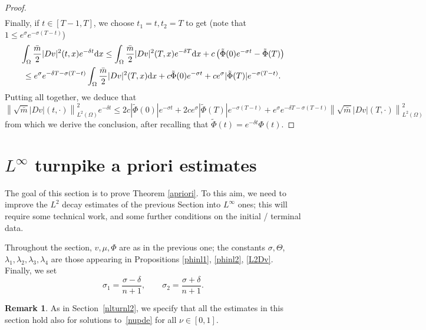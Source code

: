 \documentclass[10pt,a4paper,nouppercase,nowrite]{article}
\numberwithin{equation}{section}
\newcommand{\di}{{\rm d}}
\theoremstyle{definition}
\newtheorem{rmk}[defn]{Remark}
\begin{document}
\begin{proof}
\begin{multline*}
		\end{multline*}
		Finally, if $t \in [T-1,T]$, we choose $t_1=t, t_2=T$ to get (note that $1 \le e^\sigma e^{-\sigma(T-t)}$)
		\begin{multline*}
			\int_{\Omega} \frac{\bar{m}}{2} |Dv|^2(t,x) e^{-\delta t} \di x \le \int_{\Omega} \frac{\bar{m}}{2} |Dv|^2(T,x) e^{-\delta T} \di x + c \left( \tilde{\Phi}(0) e^{-\sigma t} - \tilde{\Phi}(T)\right) \\
			\le e^\sigma e^{-\delta T-\sigma(T-t)} \int_{\Omega} \frac{\bar{m}}{2} |Dv|^2(T,x)  \di x + c \tilde{\Phi}(0) e^{-\sigma t} + c e^\sigma |\tilde{\Phi}(T)| e^{-\sigma(T-t)}.
		\end{multline*}
		Putting all together, we deduce that
		\[
			\left \| \sqrt{\bar{m}}|Dv|(t,\cdot) \right\|^2_{L^2(\Omega)} e^{-\delta t} \le 2c|\tilde{\Phi}(0)| e^{-\sigma t} +2ce^\sigma |\tilde{\Phi}(T)| e^{-\sigma(T-t)}+e^\sigma e^{-\delta T-\sigma(T-t)}\left\| \sqrt{\bar{m}}|Dv|(T,\cdot) \right\|^2_{L^2(\Omega)}
		\]
		from which we derive the conclusion, after recalling that $\tilde{\Phi}(t) =e^{-\delta t} \Phi(t)$.
	\end{proof}
	

\section{$L^\infty$ turnpike a priori estimates} \label{nlturnlinf}

	The goal of this section is to prove Theorem \ref{apriori}. To this aim, we need to improve the $L^2$ decay estimates of the previous Section into $L^\infty$ ones; this will require some technical work, and some further conditions on the initial / terminal data.
	
	Throughout the section, $v, \mu, \Phi$ are as in the previous one; the constants $\sigma, \Theta$, $\lambda_1, \lambda_2, \lambda_3, \lambda_4$ are those appearing in Propositions \ref{phinl1}, \ref{phinl2}, \ref{L2Dv}. Finally, we set
	$$\sigma_1=\frac{\sigma-\delta}{n+1}, \qquad \sigma_2=\frac{\sigma+\delta}{n+1}.$$
	
	\begin{rmk} \label{nurmk3}
		As in Section~\ref{nlturnl2}, we specify that all the estimates in this section hold also for solutions to~\eqref{nupde} for all $\nu \in [0,1]$. 
	\end{rmk}
\end{document}
